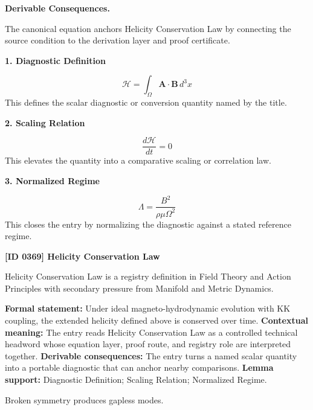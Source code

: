 \par\vspace{0.35em}
\noindent\textbf{Derivable Consequences.}\quad
\begingroup
\footnotesize
\raggedright
The canonical equation anchors Helicity Conservation Law by connecting the source condition to the derivation layer and proof certificate.
\par\endgroup

\noindent\textbf{1. Diagnostic Definition}\par
\[
\mathcal{H}=\int_{\Omega}\mathbf{A}\cdot\mathbf{B}\,d^{3}x
\]
\noindent This defines the scalar diagnostic or conversion quantity named by the title.\par
\noindent\textbf{2. Scaling Relation}\par
\[
\frac{d\mathcal{H}}{dt}=0
\]
\noindent This elevates the quantity into a comparative scaling or correlation law.\par
\noindent\textbf{3. Normalized Regime}\par
\[
\Lambda=\frac{B^{2}}{\rho\mu\Omega^{2}}
\]
\noindent This closes the entry by normalizing the diagnostic against a stated reference regime.\par

\clearpage
\noindent\textbf{[ID 0369] Helicity Conservation Law}\par
\vspace{0.35em}
\begingroup\small
{}
Helicity Conservation Law is a registry definition in Field Theory and Action Principles with secondary pressure from Manifold and Metric Dynamics.

\begingroup\footnotesize\setlength{\emergencystretch}{3em}\sloppy
\textbf{Formal statement:} Under ideal magneto-hydrodynamic evolution with KK coupling, the extended helicity defined above is conserved over time. \textbf{Contextual meaning:} The entry reads Helicity Conservation Law as a controlled technical headword whose equation layer, proof route, and registry role are interpreted together. \textbf{Derivable consequences:} The entry turns a named scalar quantity into a portable diagnostic that can anchor nearby comparisons. \textbf{Lemma support:} Diagnostic Definition; Scaling Relation; Normalized Regime.\par
\endgroup

Broken symmetry produces gapless modes.

